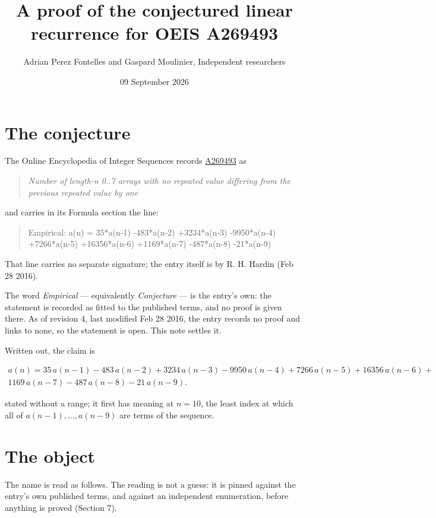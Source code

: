 \documentclass[11pt]{article}
\title{A proof of the conjectured linear recurrence for OEIS A269493}
\author{Adrian Perez Fontelles and Gaspard Moulinier, Independent researchers}
\date{09 September 2026}
\theoremstyle{definition}
\begin{document}
\maketitle
\section{The conjecture}

The Online Encyclopedia of Integer Sequences records \href{https://oeis.org/A269493}{A269493} as

\begin{quote}\itshape Number of length-n 0..7 arrays with no repeated value differing from the previous repeated value by one\end{quote}

and carries in its Formula section the line:

\begin{quote}\ttfamily Empirical: a(n) = 35*a(n-1) -483*a(n-2) +3234*a(n-3) -9950*a(n-4) +7266*a(n-5) +16356*a(n-6) +1169*a(n-7) -487*a(n-8) -21*a(n-9)\end{quote}

That line carries no separate signature; the entry itself is by R. H. Hardin (Feb 28 2016).

The word {\itshape Empirical} --- equivalently {\itshape Conjecture} --- is the entry's own: the statement is recorded as fitted to the published terms, and no proof is given there. As of revision 4, last modified Feb 28 2016, the entry records no proof and links to none, so the statement is open. This note settles it.

Written out, the claim is

\begin{multline*} a(n) = 35\,a(n-1) - 483\,a(n-2) + 3234\,a(n-3) - 9950\,a(n-4) + 7266\,a(n-5) + 16356\,a(n-6) + \\ 1169\,a(n-7) - 487\,a(n-8) - 21\,a(n-9). \end{multline*}

stated without a range; it first has meaning at $n = 10$, the least index at which all of $a(n-1),\dots,a(n-9)$ are terms of the sequence.

\section{The object}

The name is read as follows. The reading is not a guess: it is pinned against the entry's own published terms, and against an independent enumeration, before anything is proved (Section 7).
\end{document}
